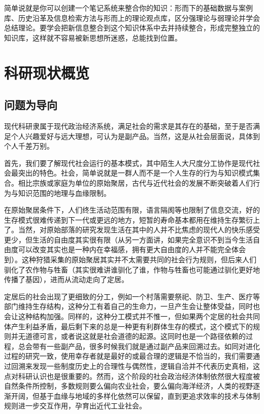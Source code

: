 \documentclass[]{tufte-book}
\begin{document}
简单说就是你可以创建一个笔记系统来整合你的知识：形而下的基础数据与案例库、历史沿革及信息检索方法与形而上的理论观点库，区分强理论与弱理论并学会总结理论。要学会把新信息整合到这个知识体系中去并持续整合，形成完整独立的知识库，这样就不容易被新思想所迷惑，总能找到位置。

\hypertarget{view}{%
\chapter{科研现状概览}\label{view}}

\hypertarget{ux95eeux9898ux4e3aux5bfcux5411}{%
\section{问题为导向}\label{ux95eeux9898ux4e3aux5bfcux5411}}

现代科研隶属于现代政治经济系统，满足社会的需求是其存在的基础，至于是否满足个人兴趣爱好与远大理想，可认为是副产品。当然，这是从社会层面说，具体到个人千差万别。

首先，我们要了解现代社会运行的基本模式，其中陌生人大尺度分工协作是现代社会最突出的特色。社会，简单说就是一群人而不是一个人生存的行为与知识模式集合。相比宗族或家庭为单位的原始聚居，古代与近代社会的发展不断突破着人们行为与知识范围的地理与血缘限制。

在原始聚居条件下，人们终生活动范围有限，语言隔阂等也限制了信息交流，好的生存模式很难传递到下一代或更远的地方，短暂的寿命基本都用在维持生存繁衍上了。当然，对原始部落的研究发现生活在其中的人并不比焦虑的现代人的快乐感受更少，但生活的自由度其实很有限（从另一方面讲，如果完全意识不到当今生活自由度可以改变其实也是一种内在幸福感，拥有更大自由度的人并不能完全体会到）。这种狩猎采集的原始聚居其实并不太需要共同的社会行为规则，但后来人们驯化了农作物与牲畜（其实很难讲谁驯化了谁，作物与牲畜也可能通过驯化更好地传播了基因），进而从流动走向了定居。

定居后的社会出现了更细致的分工，例如一个村落需要祭祀、防卫、生产、医疗等部门维持生存结构，这种分工有着自己的生命力，一旦产生会让整体受益，同时也会让这种结构加强。同样的，这种分工模式并不惟一，但如果两个定居的社会共同体产生利益矛盾，最后剩下来的总是一种更有利群体生存的模式，这个模式下的规则并无道德可言，或者说这就是社会道德的起源。这同时也是一个路径依赖的过程，总会带有一些副产品，很多时候我们就是通过副产品来回溯过去。如同对进化过程的研究一致，使用幸存者就是最好的或最合理的逻辑是不恰当的，我们需要通过回溯来发现一些制度历史上的合理性与偶然性，逻辑自洽并不代表历史真相，这点对科研认识也是很重要的。然而，这个阶段的社会政治经济体制依然很大程度被自然条件所控制，多数规则要么偏向农业社会，要么偏向海洋经济，人类的视野逐渐开阔，但基于血缘与地域的多样化依然可以保留，直到更追求效率的技术与体制规则进一步交互作用，孕育出近代工业社会。
\end{document}
